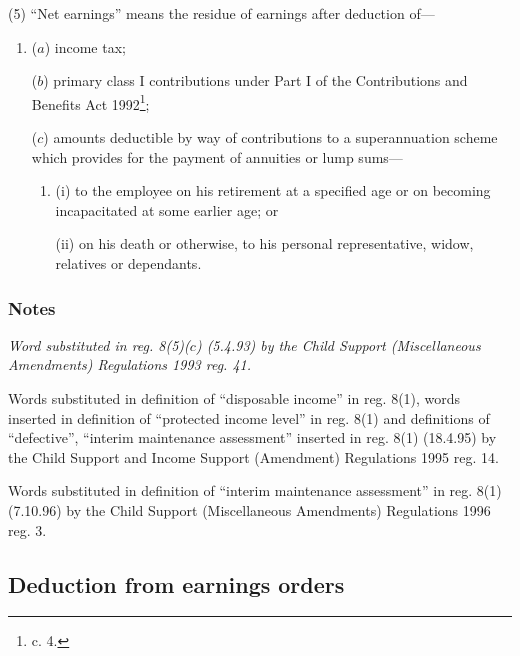 \documentclass[a4paper]{article}
\newcommand\amendment[1]{\subsubsection*{Notes}{\itshape\frenchspacing\footnotesize #1 \par}}
\begin{document}
(5) “Net earnings” means the residue of earnings after deduction of—
\begin{enumerate}\item[]
($a$) income tax;

($b$) primary class I contributions under Part I of the Contributions and Benefits Act 1992\footnote{ c. 4.};

($c$) amounts deductible by way of contributions to a superannuation scheme which provides for the payment of annuities or 
lump %
sums—
\begin{enumerate}\item[]
(i) to the employee on his retirement at a specified age or on becoming incapacitated at some earlier age; or

(ii) on his death or otherwise, to his personal representative, widow, relatives or dependants.
\end{enumerate}
\end{enumerate}

\amendment{
Word substituted in reg. 8(5)($c$) (5.4.93) by the Child Support (Miscellaneous Amendments) Regulations 1993 reg. 41.

Words substituted in definition of ``disposable income'' in reg. 8(1), words inserted in definition of ``protected income level'' in reg. 8(1) and definitions of ``defective'', ``interim maintenance assessment'' inserted in reg. 8(1) (18.4.95) by the Child Support and Income Support (Amendment) Regulations 1995 reg. 14.

Words substituted in definition of ``interim maintenance assessment'' in reg. 8(1) (7.10.96) by the Child Support (Miscellaneous Amendments) Regulations 1996 reg. 3.
}

\subsection[9. Deduction from earnings orders]{Deduction from earnings orders}
\end{document}
